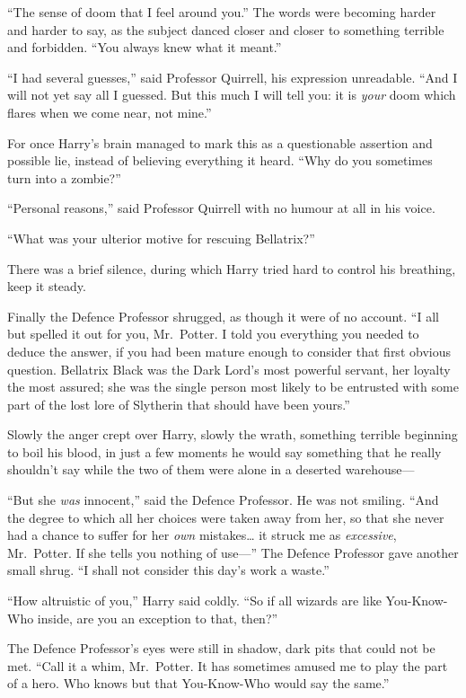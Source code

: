 ``The sense of doom that I feel around you.'' The words were becoming
harder and harder to say, as the subject danced closer and closer to
something terrible and forbidden. ``You always knew what it meant.''

``I had several guesses,'' said Professor Quirrell, his expression
unreadable. ``And I will not yet say all I guessed. But this much I will
tell you: it is \emph{your} doom which flares when we come near, not
mine.''

For once Harry's brain managed to mark this as a questionable assertion
and possible lie, instead of believing everything it heard. ``Why do you
sometimes turn into a zombie?''

``Personal reasons,'' said Professor Quirrell with no humour at all in
his voice.

``What was your ulterior motive for rescuing Bellatrix?''

There was a brief silence, during which Harry tried hard to control his
breathing, keep it steady.

Finally the Defence Professor shrugged, as though it were of no account.
``I all but spelled it out for you, Mr.~Potter. I told you everything
you needed to deduce the answer, if you had been mature enough to
consider that first obvious question. Bellatrix Black was the Dark
Lord's most powerful servant, her loyalty the most assured; she was the
single person most likely to be entrusted with some part of the lost
lore of Slytherin that should have been yours.''

Slowly the anger crept over Harry, slowly the wrath, something terrible
beginning to boil his blood, in just a few moments he would say
something that he really shouldn't say while the two of them were alone
in a deserted warehouse---

``But she \emph{was} innocent,'' said the Defence Professor. He was not
smiling. ``And the degree to which all her choices were taken away from
her, so that she never had a chance to suffer for her \emph{own}
mistakes\ldots{} it struck me as \emph{excessive}, Mr.~Potter. If she
tells you nothing of use---'' The Defence Professor gave another small
shrug. ``I shall not consider this day's work a waste.''

``How altruistic of you,'' Harry said coldly. ``So if all wizards are
like You-Know-Who inside, are you an exception to that, then?''

The Defence Professor's eyes were still in shadow, dark pits that could
not be met. ``Call it a whim, Mr.~Potter. It has sometimes amused me to
play the part of a hero. Who knows but that You-Know-Who would say the
same.''

